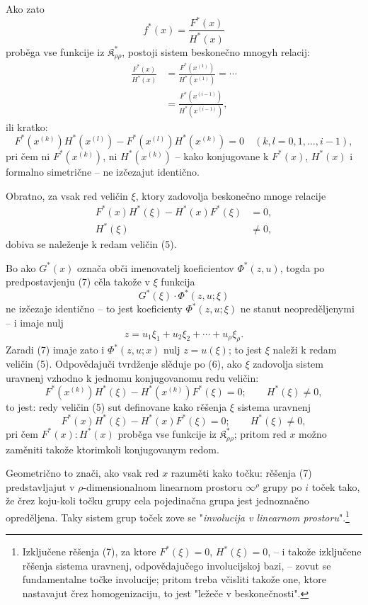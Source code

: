 \documentclass[11pt]{article}
\providecommand{\Kfield}{\mathfrak{K}}
\begin{document}
Ako zato
\[
  f^*(x)=\frac{F^*(x)}{H^*(x)}
\]
proběga vse funkcije iz $\Kfield^*_{\rho\rho}$, postoji sistem beskonečno mnogyh relacij:
\begin{equation}
\begin{aligned}
  \frac{F^*(x)}{H^*(x)}
  &=\frac{F^*(x^{(1)})}{H^*(x^{(1)})}=\cdots\\
  &=\frac{F^*(x^{(i-1)})}{H^*(x^{(i-1)})},
\end{aligned}
\tag{6}
\end{equation}
ili kratko:
\[
  F^*(x^{(k)})H^*(x^{(l)})-
  F^*(x^{(l)})H^*(x^{(k)})=0
  \quad(k,l=0,1,\ldots,i-1),
\]
pri čem ni $F^*(x^{(k)})$, ni $H^*(x^{(k)})$ -- kako konjugovane k $F^*(x)$, $H^*(x)$ i formalno simetrične -- ne izčezajut identično.

Obratno, za vsak red veličin $\xi$, ktory zadovolja beskonečno mnoge relacije
\begin{equation}
\begin{aligned}
  F^*(x)H^*(\xi)-H^*(x)F^*(\xi)&=0,\\
  H^*(\xi)&\ne0,
\end{aligned}
\tag{7}
\end{equation}
dobiva se naleženje k redam veličin (5).

Bo ako $G^*(x)$ označa obči imenovatelj koeficientov $\Phi^*(z,u)$, togda po predpostavjenju (7) cěla takože v $\xi$ funkcija
\[
  G^*(\xi)\cdot\Phi^*(z,u;\xi)
\]
ne izčezaje identično -- to jest koeficienty $\Phi^*(z,u;\xi)$ ne stanut neopreděljenymi -- i imaje nulj
\[
  z=u_1\xi_1+u_2\xi_2+\cdots+u_\rho\xi_\rho.
\]
Zaradi (7) imaje zato i $\Phi^*(z,u;x)$ nulj $z=u(\xi)$; to jest $\xi$ naleži k redam veličin (5). Odpovědajuči tvrdženje slěduje po (6), ako $\xi$ zadovolja sistem uravnenj vzhodno k jednomu konjugovanomu redu veličin:
\[
  F^*(x^{(k)})H^*(\xi)-H^*(x^{(k)})F^*(\xi)=0;
  \qquad H^*(\xi)\ne0,
\]
to jest: redy veličin (5) sut definovane kako rěšenja $\xi$ sistema uravnenj
\[
  F^*(x)H^*(\xi)-H^*(x)F^*(\xi)=0;
  \qquad H^*(\xi)\ne0,
\]
pri čem $F^*(x):H^*(x)$ proběga vse funkcije iz $\Kfield^*_{\rho\rho}$; pritom red $x$ možno zaměniti takože ktorimkoli konjugovanym redom.

Geometrično to znači, ako vsak red $x$ razuměti kako točku: rěšenja (7) predstavljajut v $\rho$-dimensionalnom linearnom prostoru $\infty^\rho$ grupy po $i$ toček tako, že črez koju-koli točku grupy cela pojedinačna grupa jest jednoznačno opreděljena. Taky sistem grup toček zove se "{\itshape involucija v linearnom prostoru}".\footnote{Izključene rěšenja (7), za ktore $F^*(\xi)=0$, $H^*(\xi)=0$, -- i takože izključene rěšenja sistema uravnenj, odpovědajučego involucijskoj bazi, -- zovut se fundamentalne točke involucije; pritom treba včisliti takože one, ktore nastavajut črez homogenizaciju, to jest "ležeče v beskonečnosti".}
\end{document}
